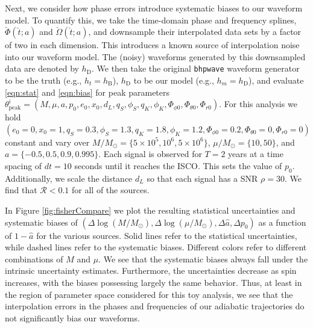 \documentclass[%
 reprint,
 nofootinbib,
 amsmath,amssymb,
 aps,
 prd,
]{revtex4-2}
\begin{document}
Next, we consider how phase errors introduce systematic biases to our waveform model. To quantify this, we take the time-domain phase and frequency splines, $\check{\Phi}(\check{t}; a)$ and $\check{\Omega}(\check{t}; a)$, and downsample their interpolated data sets by a factor of two in each dimension. This introduces a known source of interpolation noise into our waveform model. The (noisy) waveforms generated by this downsampled data are denoted by $h_\mathrm{D}$. We then take the original \texttt{bhpwave} waveform generator to be the truth (e.g., $h_t = h_\mathrm{B}$), $h_\mathrm{D}$ to be our model (e.g., $h_m = h_\mathrm{D}$), and evaluate \eqref{eqn:stat} and \eqref{eqn:bias} for peak parameters $\theta^i_\mathrm{peak} = (M, \mu, a, p_0, e_0, x_0, d_L, q_S, \phi_S, q_K, \phi_K, \Phi_{\phi0}, \Phi_{\theta0}, \Phi_{r0})$. For this analysis we hold $(e_0 = 0, x_0 = 1, q_S = 0.3, \phi_S = 1.3, q_K = 1.8, \phi_K = 1.2, \Phi_{\phi 0} = 0.2, \Phi_{\theta0} = 0, \Phi_{r0} = 0)$ constant and vary over $M/M_\odot = \{5\times 10^{5}, 10^{6}, 5\times 10^{6}\}$, $\mu/M_\odot = \{10, 50\}$, and $a = \{-0.5, 0.5, 0.9, 0.995\}$. Each signal is observed for $T = 2$ years at a time spacing of $dt = 10 $ seconds until it reaches the ISCO. This sets the value of $p_0$. Additionally, we scale the distance $d_L$ so that each signal has a SNR $\rho = 30$. We find that $\mathcal{R} < 0.1$ for all of the sources. 

In Figure \ref{fig:fisherCompare} we plot the resulting statistical uncertainties and systematic biases of $(\Delta\log(M/M_\odot), \Delta\log(\mu/M_\odot), \Delta \hat{a}, \Delta p_0)$ as a function of $1-\hat{a}$ for the various sources. Solid lines refer to the statistical uncertainties, while dashed lines refer to the systematic biases. Different colors refer to different combinations of $M$ and $\mu$. We see that the systematic biases always fall under the intrinsic uncertainty estimates. Furthermore, the uncertainties decrease as spin increases, with the biases possessing largely the same behavior. Thus, at least in the region of parameter space considered for this toy analysis, we see that the interpolation errors in the phases and frequencies of our adiabatic trajectories do not significantly bias our waveforms.
\end{document}
